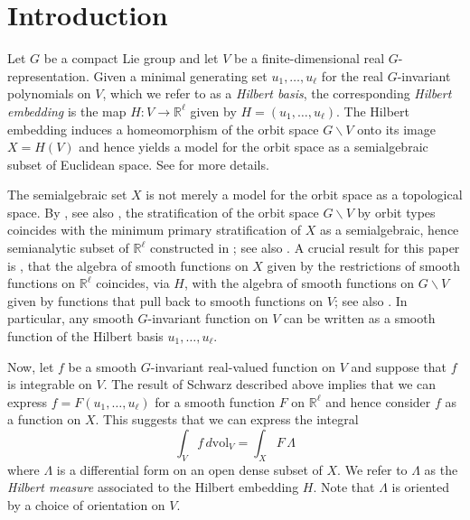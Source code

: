 \documentclass[twoside]{amsart}
\theoremstyle{definition}
\theoremstyle{remark}
\numberwithin{equation}{section}
\newcommand{\R}{\mathbb{R}}
\newcommand{\vol}{\text{vol}}
\begin{document}
\tableofcontents


\section{Introduction}
\label{sec:intro}

Let $G$ be a compact Lie group and let $V$ be a finite-dimensional real $G$-representation.
Given a minimal generating set $u_1,\ldots,u_\ell$ for the real $G$-invariant polynomials on $V$, which we refer to as a \emph{Hilbert basis},
the corresponding \emph{Hilbert embedding} is the map $H\colon V\to\R^\ell$ given by $H = (u_1,\ldots,u_\ell)$. The Hilbert embedding induces
a homeomorphism of the orbit space $G\backslash V$ onto its image $X = H(V)$ and hence yields a model for the orbit space as a semialgebraic
subset of Euclidean space. See \cite{BierstoneBook,ProcesiSchwarz} for more details.

The semialgebraic set $X$ is not merely a model for the orbit space as a topological space. By \cite[Thrm.~A]{BierstoneLiftingIsotopies},
see also \cite[Thrm.~2.5]{BierstoneBook}, the stratification of the orbit space $G\backslash V$ by orbit types coincides with the
minimum primary stratification of $X$ as a semialgebraic, hence semianalytic subset of $\R^\ell$ constructed in
\cite[Sec.~25]{LojasiewiczES-A}; see also \cite[Thrm.~4.9]{MatherStratMappings}.
A crucial result for this paper is \cite[Thrm.~1]{GWSdiff}, that the algebra of smooth functions on
$X$ given by the restrictions of smooth functions on $\R^\ell$ coincides, via $H$, with the algebra of smooth functions on $G\backslash V$ given
by functions that pull back to smooth functions on $V$; see also \cite[Thrm.~1]{MatherDiffInvariants}. In particular, any smooth $G$-invariant
function on $V$ can be written as a smooth function of the Hilbert basis $u_1,\ldots,u_\ell$.

Now, let $f$ be a smooth $G$-invariant real-valued function on $V$ and suppose that $f$ is integrable on $V$. The result of Schwarz described
above implies that we can express $f = F(u_1,\ldots,u_\ell)$ for a smooth function $F$ on $\R^\ell$ and hence consider $f$ as a function on $X$.
This suggests that we can express the integral
\begin{equation}
\label{eq:MainIntegral}
    \int_V f \, d\vol_V
    =   \int_X F \, \Lambda
\end{equation}
where $\Lambda$ is a differential form on an open dense subset of $X$. We refer to $\Lambda$ as the \emph{Hilbert measure} associated to
the Hilbert embedding $H$. Note that $\Lambda$ is oriented by a choice of orientation on $V$.
\end{document}
